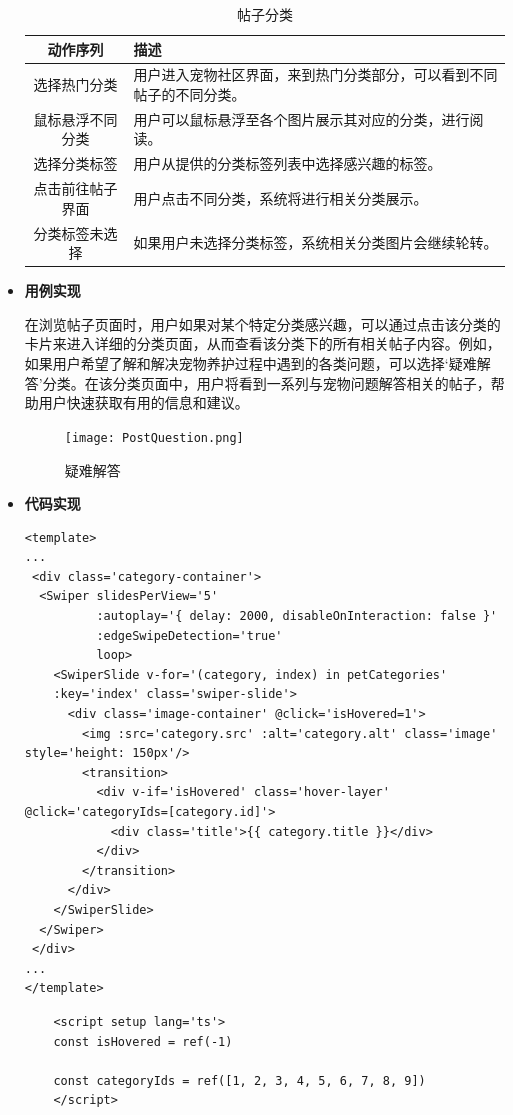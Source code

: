 \begin{itemize}
	\begin{table}[H]
		\centering
		\caption{帖子分类}
		\renewcommand\arraystretch{1.5}
		\begin{tabular}{|c|>{\raggedright\arraybackslash}p{8cm}|}
			\hline
			\textbf{动作序列} & \textbf{描述} \\ \hline
			选择热门分类 & 用户进入宠物社区界面，来到热门分类部分，可以看到不同帖子的不同分类。 \\ \hline
			鼠标悬浮不同分类 & 用户可以鼠标悬浮至各个图片展示其对应的分类，进行阅读。 \\ \hline
			选择分类标签 & 用户从提供的分类标签列表中选择感兴趣的标签。 \\ \hline
			点击前往帖子界面 & 用户点击不同分类，系统将进行相关分类展示。 \\ \hline
			分类标签未选择 & 如果用户未选择分类标签，系统相关分类图片会继续轮转。 \\ \hline
		\end{tabular}
		\label{table:post-categorize}
	\end{table}
	
	\item \textbf{用例实现}
	
	在浏览帖子页面时，用户如果对某个特定分类感兴趣，可以通过点击该分类的卡片来进入详细的分类页面，从而查看该分类下的所有相关帖子内容。例如，如果用户希望了解和解决宠物养护过程中遇到的各类问题，可以选择‘疑难解答’分类。在该分类页面中，用户将看到一系列与宠物问题解答相关的帖子，帮助用户快速获取有用的信息和建议。
	
	\begin{figure}[H]
		\centering
		\texttt{[image: PostQuestion.png]} 
		\caption{疑难解答}
		\label{fig:post-question}
	\end{figure}
	
	\item \textbf{代码实现}
	\begin{verbatim}
<template>
...
 <div class='category-container'>
  <Swiper slidesPerView='5'
          :autoplay='{ delay: 2000, disableOnInteraction: false }'
          :edgeSwipeDetection='true'
          loop>
    <SwiperSlide v-for='(category, index) in petCategories' 
    :key='index' class='swiper-slide'>
      <div class='image-container' @click='isHovered=1'>
        <img :src='category.src' :alt='category.alt' class='image' style='height: 150px'/>
        <transition>
          <div v-if='isHovered' class='hover-layer' @click='categoryIds=[category.id]'>
            <div class='title'>{{ category.title }}</div>
          </div>
        </transition>
      </div>
    </SwiperSlide>
  </Swiper>
 </div>
...
</template>
	\end{verbatim}
	
	\begin{verbatim}
	<script setup lang='ts'>
	const isHovered = ref(-1)
	
	const categoryIds = ref([1, 2, 3, 4, 5, 6, 7, 8, 9])
	</script>
	\end{verbatim}
	
\end{itemize}

